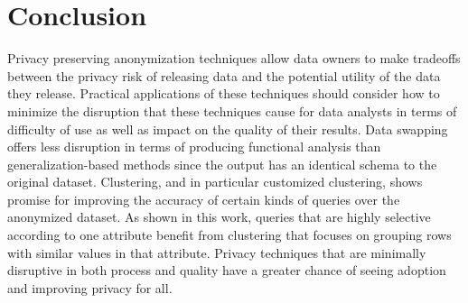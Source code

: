\section{Conclusion}
Privacy preserving anonymization techniques allow data owners to make tradeoffs between the privacy risk of releasing data and the potential utility of the data they release. Practical applications of these techniques should consider how to minimize the disruption that these techniques cause for data analysts in terms of difficulty of use as well as impact on the quality of their results. Data swapping offers less disruption in terms of producing functional analysis than generalization-based methods since the output has an identical schema to the original dataset. Clustering, and in particular customized clustering, shows promise for improving the accuracy of certain kinds of queries over the anonymized dataset. As shown in this work, queries that are highly selective according to one attribute benefit from clustering that focuses on grouping rows with similar values in that attribute. Privacy techniques that are minimally disruptive in both process and quality have a greater chance of seeing adoption and improving privacy for all.



% 





